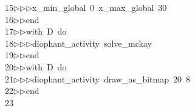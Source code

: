 \begin{tabbing}
15\>$\triangleright$\>$\triangleright$\>$\triangleright$\>x\_min\_global\ 0\ x\_max\_global\ 30\ \\[0pt]
16\>$\triangleright$\>$\triangleright$\>end\ \\[0pt]
17\>$\triangleright$\>$\triangleright$\>with\ D\ do\ \\[0pt]
18\>$\triangleright$\>$\triangleright$\>$\triangleright$\>diophant\_activity\ solve\_mckay\ \\[0pt]
19\>$\triangleright$\>$\triangleright$\>end\ \\[0pt]
20\>$\triangleright$\>$\triangleright$\>with\ D\ do\ \\[0pt]
21\>$\triangleright$\>$\triangleright$\>$\triangleright$\>diophant\_activity\ draw\_as\_bitmap\ 20\ 8\ \\[0pt]
22\>$\triangleright$\>$\triangleright$\>end\\[0pt]
23\>\end{tabbing}

